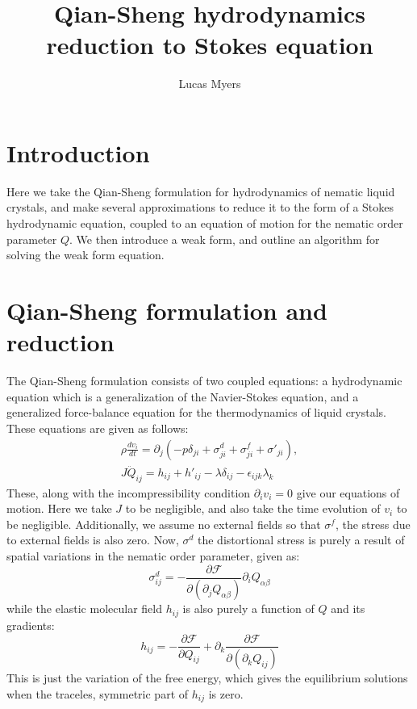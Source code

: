 \documentclass[reqno]{article}
\begin{document}
	\title{Qian-Sheng hydrodynamics reduction to Stokes equation}
	\author{Lucas Myers}
	\maketitle
	
	\section{Introduction}
  Here we take the Qian-Sheng formulation for hydrodynamics of nematic liquid
  crystals, and make several approximations to reduce it to the form of a Stokes
  hydrodynamic equation, coupled to an equation of motion for the nematic order
  parameter $Q$.
  We then introduce a weak form, and outline an algorithm for solving the weak
  form equation.

  \section{Qian-Sheng formulation and reduction}
  The Qian-Sheng formulation consists of two coupled equations: a hydrodynamic
  equation which is a generalization of the Navier-Stokes equation, and a
  generalized force-balance equation for the thermodynamics of liquid crystals.
  These equations are given as follows:
  \begin{equation}
  \begin{split}
    \rho \frac{d v_i}{dt}
    = \partial_j \left( -p \delta_{ji} + \sigma^d_{ji} + \sigma^f_{ji} + \sigma'_{ji} \right), \\
    J \ddot{Q}_{ij}
    = h_{ij} + h'_{ij} - \lambda \delta_{ij} - \epsilon_{ijk} \lambda_k
  \end{split}
  \end{equation}
  These, along with the incompressibility condition $\partial_i v_i = 0$ give
  our equations of motion.
	Here we take $J$ to be negligible, and also take the time evolution of $v_i$
  to be negligible.
  Additionally, we assume no external fields so that $\sigma^f$, the stress due
  to external fields is also zero.
  Now, $\sigma^d$ the distortional stress is purely a result of spatial
  variations in the nematic order parameter, given as:
  \begin{equation}
    \sigma^d_{ij} =
    - \frac{\partial \mathcal{F}}{\partial (\partial_j Q_{\alpha \beta})}
    \partial_i Q_{\alpha \beta}
  \end{equation}
  while the elastic molecular field $h_{ij}$ is also purely a function of $Q$
  and its gradients:
  \begin{equation}
    h_{ij}
    = - \frac{\partial \mathcal{F}}{\partial Q_{ij}}
    + \partial_k \frac{\partial \mathcal{F}}{\partial (\partial_k Q_{ij})}
  \end{equation}
	This is just the variation of the free energy, which gives the equilibrium
  solutions when the traceles, symmetric part of $h_{ij}$ is zero.
\end{document}
